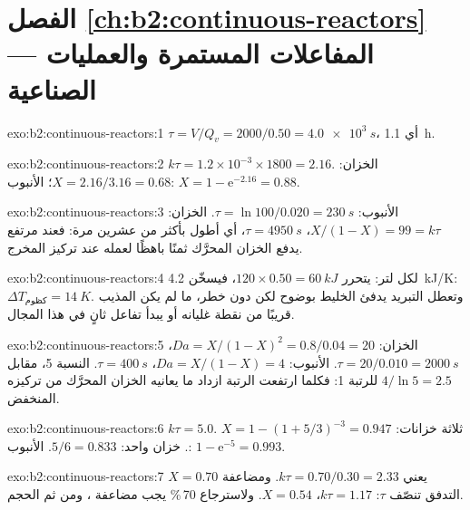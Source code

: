 \section*{الفصل \ref{ch:b2:continuous-reactors} --- المفاعلات المستمرة والعمليات الصناعية}

\begin{solution}{exo:b2:continuous-reactors:1}
$\tau = V/Q_v = 2000/0.50 = \qty{4.0e3}{s}$، أي \qty{1.1}{h}.
\end{solution}

\begin{solution}{exo:b2:continuous-reactors:2}
$k\tau = 1.2 \times 10^{-3} \times 1800 = 2.16$. الخزان: $X = 2.16/3.16 = 0.68$؛
الأنبوب: $X = 1 - \mathrm e^{-2.16} = 0.88$.
\end{solution}

\begin{solution}{exo:b2:continuous-reactors:3}
الأنبوب: $\tau = \ln 100/0.020 = \qty{230}{s}$. الخزان: $X/(1 - X) = 99 = k\tau$،
$\tau = \qty{4950}{s}$، أي أطول بأكثر من عشرين مرة: فعند  مرتفع يدفع
الخزان المحرَّك ثمنًا باهظًا لعمله عند تركيز المخرج.
\end{solution}

\begin{solution}{exo:b2:continuous-reactors:4}
لكل لتر: يتحرر $120 \times 0.50 = \qty{60}{kJ}$، فيسخّن
\qty{4.2}{kJ/K}: $\Delta T_{\text{كظوم}} = \qty{14}{K}$. وتعطل التبريد
يدفئ الخليط بوضوح لكن دون خطر، ما لم يكن المذيب
قريبًا من نقطة غليانه أو يبدأ تفاعل ثانٍ في هذا المجال.
\end{solution}

\begin{solution}{exo:b2:continuous-reactors:5}
الخزان: $Da = X/(1 - X)^2 = 0.8/0.04 = 20$، $\tau = 20/0.010 = \qty{2000}{s}$.
الأنبوب: $Da = X/(1 - X) = 4$، $\tau = \qty{400}{s}$. النسبة 5، مقابل $4/\ln 5 =
2.5$ للرتبة 1: فكلما ارتفعت الرتبة ازداد ما يعانيه الخزان المحرَّك
من تركيزه المنخفض.
\end{solution}

\begin{solution}{exo:b2:continuous-reactors:6}
$k\tau = 5.0$. ثلاثة خزانات: $X = 1 - (1 + 5/3)^{-3} = 0.947$. خزان واحد: $5/6 =
0.833$. الأنبوب: $1 - \mathrm e^{-5} = 0.993$.
\end{solution}

\begin{solution}{exo:b2:continuous-reactors:7}
$X = 0.70$ يعني $k\tau = 0.70/0.30 = 2.33$. ومضاعفة التدفق تنصّف $\tau$:
$k\tau = 1.17$، $X = 0.54$. ولاسترجاع 70\,\% يجب مضاعفة ، ومن ثم
الحجم.
\end{solution}

